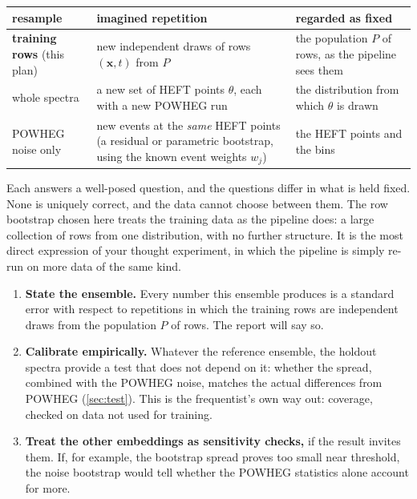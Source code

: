 \documentclass[11pt]{article}
\newcommand{\bx}{\boldsymbol{x}}
\begin{document}
\begin{center}
\small
\begin{tabular}{p{}p{}p{}}
\toprule
resample & imagined repetition & regarded as fixed\\
\midrule
\textbf{training rows} (this plan) & new independent draws of rows $(\bx, t)$ from $P$ &
  the population $P$ of rows, as the pipeline sees them\\
whole spectra & a new set of HEFT points $\theta$, each with a new POWHEG run &
  the distribution from which $\theta$ is drawn\\
POWHEG noise only & new events at the \emph{same} HEFT points (a residual or parametric
  bootstrap, using the known event weights $w_j$) & the HEFT points and the bins\\
\bottomrule
\end{tabular}
\end{center}

\noindent Each answers a well-posed question, and the questions differ in what is held
fixed. None is uniquely correct, and the data cannot choose between them. The row
bootstrap chosen here treats the training data as the pipeline does: a large collection of
rows from one distribution, with no further structure. It is the most direct expression
of your thought experiment, in which the pipeline is simply re-run on more data of the
same kind.

\begin{keyidea}
\begin{enumerate}
  \item \textbf{State the ensemble.} Every number this ensemble produces is a standard
    error with respect to repetitions in which the training rows are independent draws
    from the population $P$ of rows. The report will say so.
  \item \textbf{Calibrate empirically.} Whatever the reference ensemble, the holdout
    spectra provide a test that does not depend on it: whether the spread, combined with
    the POWHEG noise, matches the actual differences from POWHEG (\cref{sec:test}). This
    is the frequentist's own way out: coverage, checked on data not used for training.
  \item \textbf{Treat the other embeddings as sensitivity checks,} if the result invites
    them. If, for example, the bootstrap spread proves too small near threshold, the noise
    bootstrap would tell whether the POWHEG statistics alone account for more.
\end{enumerate}
\end{keyidea}
\end{document}
